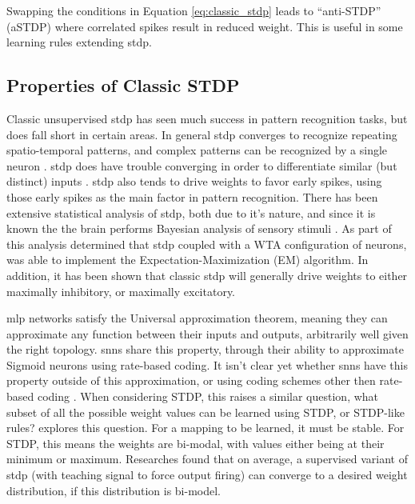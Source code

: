    Swapping the conditions in Equation \ref{eq:classic_stdp} leads to
    ``anti-STDP'' (aSTDP) where correlated spikes result in reduced weight. This
    is useful in some learning rules extending \Gls{stdp}.

    \subsection{Properties of Classic STDP}
    Classic unsupervised \Gls{stdp} has seen much success in pattern recognition
    tasks, but does fall short in certain areas. In general \Gls{stdp} converges to
    recognize repeating spatio-temporal patterns, and complex patterns can be
    recognized by a single neuron \cite{tavanaei_2019}. \Gls{stdp} does have trouble
    converging in order to differentiate similar (but distinct) inputs
    \cite{vigneron_2020}. \Gls{stdp} also tends to drive weights to favor early
    spikes, using those early spikes as the main factor in pattern
    recognition. There has been extensive statistical analysis of \Gls{stdp}, both due
    to it's nature, and since it is known the the brain performs Bayesian
    analysis of sensory stimuli \cite{tavanaei_2019}. As part of this analysis
    \parencite{nessler_2009}  determined that \Gls{stdp} coupled with a WTA
    configuration of neurons, was able to implement the Expectation-Maximization (EM)
    algorithm. In addition, it has been shown that classic \Gls{stdp} will generally
    drive weights to either maximally inhibitory, or maximally
    excitatory.



    \Gls{mlp} networks satisfy the Universal approximation theorem, meaning they
    can approximate any function between their inputs and outputs, arbitrarily
    well given the right topology. \Glspl{snn} share this property, through their
    ability to approximate Sigmoid neurons using rate-based coding. It isn't
    clear yet whether \Glspl{snn} have this property outside of this
    approximation, or using coding schemes other then rate-based coding \cite{legenstein_2005}. When considering STDP, this raises a similar
    question, what subset of all the possible weight values can be learned using
    STDP, or STDP-like rules? \parencite{legenstein_2005} explores this
    question. For a mapping to be learned, it must be stable. For
    STDP, this means the weights are bi-modal, with values either being at their
    minimum or maximum. Researches found that on average, a supervised variant
    of \Gls{stdp} (with teaching signal to force output firing) can converge to
    a desired weight distribution, if this distribution is bi-model.

